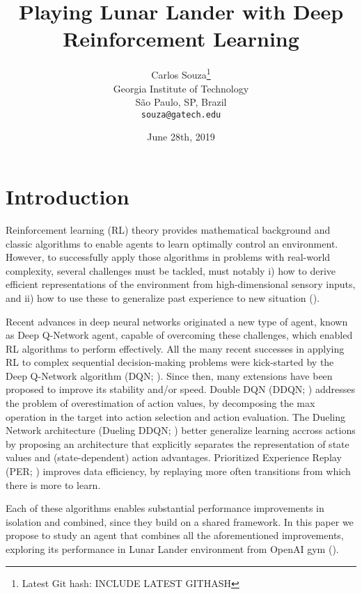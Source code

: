 \documentclass{article}
\title{Playing Lunar Lander with Deep Reinforcement Learning}
\date{June 28th, 2019}
\author{
Carlos Souza\thanks{Latest Git hash: INCLUDE LATEST GITHASH}\\
Georgia Institute of Technology\\
São Paulo, SP, Brazil \\
\texttt{souza@gatech.edu} \\
}
\begin{document}
    \maketitle

    \begin{abstract}
        \lipsum[1]
    \end{abstract}




    \section{Introduction}
    \label{sec:introduction}
    Reinforcement learning (RL) theory provides mathematical background and classic algorithms to enable agents to learn optimally control an environment.
    However, to successfully apply those algorithms in problems with real-world complexity, several challenges must be tackled, must notably i) how to derive efficient representations of the environment from high-dimensional sensory inputs, and ii) how to use these to generalize past experience to new situation (\cite{dqn}).

    Recent advances in deep neural networks originated a new type of agent, known as Deep Q-Network agent, capable of overcoming these challenges, which enabled RL algorithms to perform effectively.
    All the many recent successes in applying RL to complex sequential decision-making problems were kick-started by the Deep Q-Network algorithm (DQN; \cite{dqn}).
    Since then, many extensions have been proposed to improve its stability and/or speed.
Double DQN (DDQN; \cite{ddqn}) addresses the problem of overestimation of action values, by decomposing the max operation in the target into action selection and action evaluation.
    The Dueling Network architecture (Dueling DDQN; \cite{dueling}) better generalize learning accross actions by proposing an architecture that explicitly separates the representation of state values and (state-dependent) action advantages.
    Prioritized Experience Replay (PER; \cite{per}) improves data efficiency, by replaying more often transitions from which there is more to learn.

    Each of these algorithms enables substantial performance improvements in isolation and combined, since they build on a shared framework.
    In this paper we propose to study an agent that combines all the aforementioned improvements, exploring its performance in Lunar Lander environment from OpenAI gym (\cite{openai}).
\end{document}
